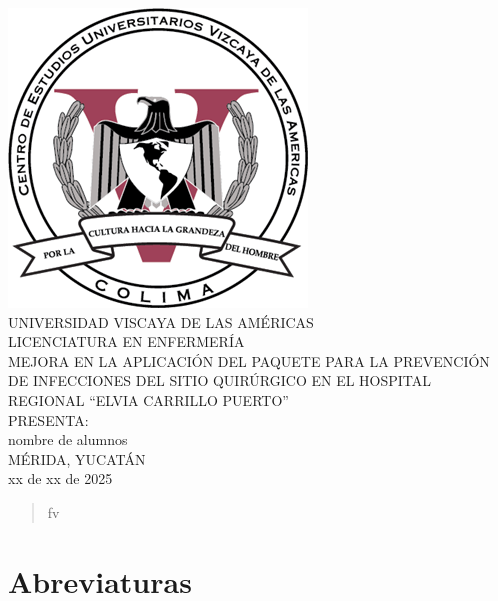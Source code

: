 \documentclass[12 pt]{report}
\begin{document}
	\begin{titlepage}
		\begin{center}
			
			\includegraphics [scale=0.5]{UVA-logo.png} \\
			\vspace{15 pt}
			\LARGE{UNIVERSIDAD VISCAYA DE LAS AMÉRICAS} \\
			\vspace{20 pt}
			\LARGE{LICENCIATURA EN ENFERMERÍA}\\
			\vspace{30 pt}
			\large{MEJORA EN LA APLICACIÓN DEL PAQUETE PARA LA PREVENCIÓN DE INFECCIONES DEL SITIO QUIRÚRGICO EN EL HOSPITAL REGIONAL ``ELVIA CARRILLO PUERTO'' }\\
			\vspace{40 pt}
			\large{PRESENTA:}\\
			\vspace{30 pt}
			\large{nombre de alumnos}\\
			\vspace{40 pt}
			\large{MÉRIDA, YUCATÁN}\\
			\large{xx de xx de 2025}
			
		\end{center}
	\end{titlepage}	
	

	\tableofcontents
	\thispagestyle{empty}
	
	\begin{abstract}
		fv
	\end{abstract}
	
	
	\section*{Abreviaturas} 
\end{document}
